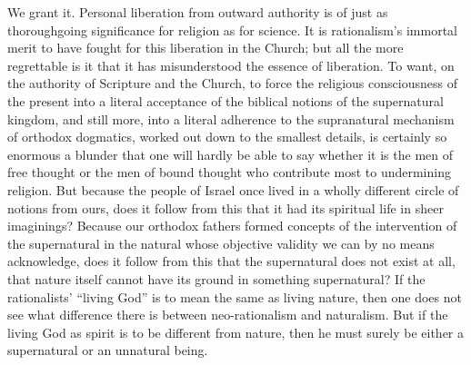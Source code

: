 \documentclass[12pt,a4paper,openany]{book}
\newcommand{\opage}[1]{\marginnote{\footnotesize\textit{[#1]}}}
\begin{document}
We grant it. Personal liberation from outward
authority is of just as thoroughgoing significance
for religion as for science. It is
rationalism's immortal merit to have fought
for this liberation in the Church; but all the more regrettable
is it that it has misunderstood the essence of liberation.
To want, on the authority of Scripture and the Church, to force the
religious consciousness of the present into a literal acceptance
of the biblical notions of the supernatural
kingdom, and still more, into a literal adherence
to the supranatural mechanism of orthodox dogmatics, worked out down to the smallest details,
is certainly so enormous a blunder that one will hardly be able to
say whether it is the men of free thought or
the men of bound thought who contribute most to undermining
religion. But because the people of Israel once
lived in a wholly different circle of notions from ours,
does it follow from this that it had its spiritual life in sheer
imaginings? Because our orthodox fathers formed
concepts of the intervention of the supernatural in the
natural whose objective validity we can by no means
acknowledge, does it follow from this that the supernatural does not
exist at all, that nature itself cannot have its ground in something
supernatural? If the rationalists' ``living God''
is to mean the same as living nature, then
one does not see what difference there is between neo-rationalism
and naturalism. But if the living God as
\setcounter{footnote}{0}%
\opage{108}spirit is to be different from nature, then he must
surely be either a supernatural or an unnatural being.
\end{document}
